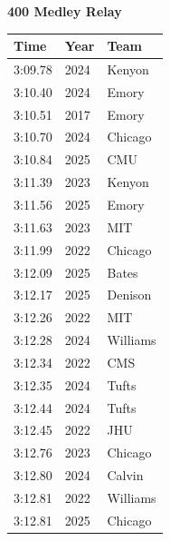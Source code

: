 \noindent\begin{minipage}[t]{0.98\textwidth}
\centering
\textbf{\textcolor{teamprimary}{400 Medley Relay}}\par
\vspace{0.5em}
\centering
\small
\renewcommand{\arraystretch}{1.0}
\setlength{\tabcolsep}{4pt}
\begin{tabular}{@{}p{4.5cm}p{2.5cm}p{4.5cm}@{}}
\toprule
\textbf{Time} & \textbf{Year} & \textbf{Team} \\
\midrule
3:09.78 & 2024 & Kenyon \\
3:10.40 & 2024 & Emory \\
3:10.51 & 2017 & Emory \\
3:10.70 & 2024 & Chicago \\
3:10.84 & 2025 & CMU \\
3:11.39 & 2023 & Kenyon \\
3:11.56 & 2025 & Emory \\
3:11.63 & 2023 & MIT \\
3:11.99 & 2022 & Chicago \\
3:12.09 & 2025 & Bates \\
3:12.17 & 2025 & Denison \\
3:12.26 & 2022 & MIT \\
3:12.28 & 2024 & Williams \\
3:12.34 & 2022 & CMS \\
3:12.35 & 2024 & Tufts \\
3:12.44 & 2024 & Tufts \\
3:12.45 & 2022 & JHU \\
3:12.76 & 2023 & Chicago \\
3:12.80 & 2024 & Calvin \\
3:12.81 & 2022 & Williams \\
3:12.81 & 2025 & Chicago \\
\bottomrule
\end{tabular}
\end{minipage}
